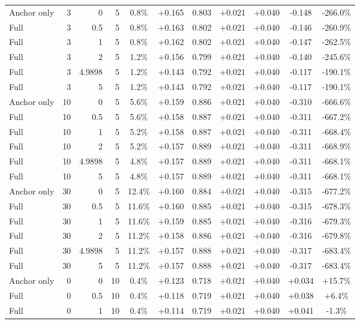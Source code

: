 \begin{table}[htbp]
\begin{tabular}{lrrrccccccc}
Anchor only & 3 & 0 & 5 & 0.8\% & +0.165 & 0.803 & +0.021 & +0.040 & -0.148 & -266.0\% \\
Full & 3 & 0.5 & 5 & 0.8\% & +0.163 & 0.802 & +0.021 & +0.040 & -0.146 & -260.9\% \\
Full & 3 & 1 & 5 & 0.8\% & +0.162 & 0.802 & +0.021 & +0.040 & -0.147 & -262.5\% \\
Full & 3 & 2 & 5 & 1.2\% & +0.156 & 0.799 & +0.021 & +0.040 & -0.140 & -245.6\% \\
Full & 3 & 4.9898 & 5 & 1.2\% & +0.143 & 0.792 & +0.021 & +0.040 & -0.117 & -190.1\% \\
Full & 3 & 5 & 5 & 1.2\% & +0.143 & 0.792 & +0.021 & +0.040 & -0.117 & -190.1\% \\
Anchor only & 10 & 0 & 5 & 5.6\% & +0.159 & 0.886 & +0.021 & +0.040 & -0.310 & -666.6\% \\
Full & 10 & 0.5 & 5 & 5.6\% & +0.158 & 0.887 & +0.021 & +0.040 & -0.311 & -667.2\% \\
Full & 10 & 1 & 5 & 5.2\% & +0.158 & 0.887 & +0.021 & +0.040 & -0.311 & -668.4\% \\
Full & 10 & 2 & 5 & 5.2\% & +0.157 & 0.889 & +0.021 & +0.040 & -0.311 & -668.9\% \\
Full & 10 & 4.9898 & 5 & 4.8\% & +0.157 & 0.889 & +0.021 & +0.040 & -0.311 & -668.1\% \\
Full & 10 & 5 & 5 & 4.8\% & +0.157 & 0.889 & +0.021 & +0.040 & -0.311 & -668.1\% \\
Anchor only & 30 & 0 & 5 & 12.4\% & +0.160 & 0.884 & +0.021 & +0.040 & -0.315 & -677.2\% \\
Full & 30 & 0.5 & 5 & 11.6\% & +0.160 & 0.885 & +0.021 & +0.040 & -0.315 & -678.3\% \\
Full & 30 & 1 & 5 & 11.6\% & +0.159 & 0.885 & +0.021 & +0.040 & -0.316 & -679.3\% \\
Full & 30 & 2 & 5 & 11.2\% & +0.158 & 0.886 & +0.021 & +0.040 & -0.316 & -679.8\% \\
Full & 30 & 4.9898 & 5 & 11.2\% & +0.157 & 0.888 & +0.021 & +0.040 & -0.317 & -683.4\% \\
Full & 30 & 5 & 5 & 11.2\% & +0.157 & 0.888 & +0.021 & +0.040 & -0.317 & -683.4\% \\
Anchor only & 0 & 0 & 10 & 0.4\% & +0.123 & 0.718 & +0.021 & +0.040 & +0.034 & +15.7\% \\
Full & 0 & 0.5 & 10 & 0.4\% & +0.118 & 0.719 & +0.021 & +0.040 & +0.038 & +6.4\% \\
Full & 0 & 1 & 10 & 0.4\% & +0.114 & 0.719 & +0.021 & +0.040 & +0.041 & -1.3\% \\

\end{tabular}
\end{table}
